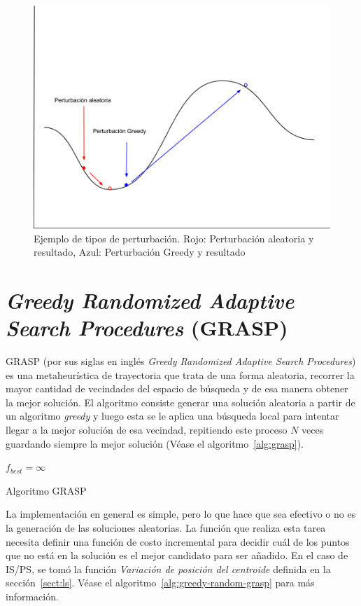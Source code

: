 \documentclass{ci5652}
\begin{document}
\begin{figure}[h!]
	\centering
	\includegraphics[width=\linewidth]{perturbaciones}
	\caption{Ejemplo de tipos de perturbación. Rojo: Perturbación aleatoria y resultado, Azul: Perturbación Greedy y resultado}
	\label{fig:perturbaciones}
\end{figure}

\section{\textit{\textbf{Greedy Randomized Adaptive Search Procedures}} (GRASP)}

GRASP (por sus siglas en inglés \textit{Greedy Randomized Adaptive Search Procedures}) es una metaheurística de trayectoria que trata de una forma aleatoria, recorrer la mayor cantidad de vecindades del espacio de búsqueda y de esa manera obtener la mejor solución. El algoritmo consiste generar una solución aleatoria a partir de un algoritmo \textit{greedy} y luego esta se le aplica una búsqueda local para intentar llegar a la mejor solución de esa vecindad, repitiendo este proceso $N$ veces guardando siempre la mejor solución (Véase el algoritmo~\ref{alg:grasp}). 

\begin{algorithm}
 \DontPrintSemicolon
 \vspace*{0.1cm}
 
 $f_{best} = \infty$\;
 \vspace*{0.1cm}
 \caption{Algoritmo GRASP}
 \label{alg:grasp}
\end{algorithm}
La implementación en general es simple, pero lo que hace que sea efectivo o no es la generación de las soluciones aleatorias. La función que realiza esta tarea necesita definir una función de costo incremental para decidir cuál de los puntos que no está en la solución es el mejor candidato para ser añadido. En el caso de IS/PS, se tomó la función \textit{Variación de posición del centroide} definida en la sección~\ref{sect:ls}. Véase el algoritmo~\ref{alg:greedy-random-grasp} para más información.
\end{document}
